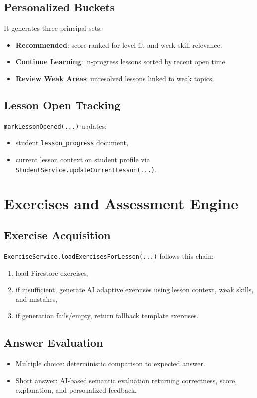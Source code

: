 \documentclass[11pt,a4paper]{article}
\begin{document}
\subsection{Personalized Buckets}
It generates three principal sets:
\begin{itemize}
  \item \textbf{Recommended}: score-ranked for level fit and weak-skill relevance.
  \item \textbf{Continue Learning}: in-progress lessons sorted by recent open time.
  \item \textbf{Review Weak Areas}: unresolved lessons linked to weak topics.
\end{itemize}

\subsection{Lesson Open Tracking}
\texttt{markLessonOpened(...)} updates:
\begin{itemize}
  \item student \texttt{lesson\_progress} document,
  \item current lesson context on student profile via \texttt{StudentService.updateCurrentLesson(...)}.
\end{itemize}

\section{Exercises and Assessment Engine}
\subsection{Exercise Acquisition}
\texttt{ExerciseService.loadExercisesForLesson(...)} follows this chain:
\begin{enumerate}
  \item load Firestore exercises,
  \item if insufficient, generate AI adaptive exercises using lesson context, weak skills, and mistakes,
  \item if generation fails/empty, return fallback template exercises.
\end{enumerate}

\subsection{Answer Evaluation}
\begin{itemize}
  \item Multiple choice: deterministic comparison to expected answer.
  \item Short answer: AI-based semantic evaluation returning correctness, score, explanation, and personalized feedback.
\end{itemize}
\end{document}

